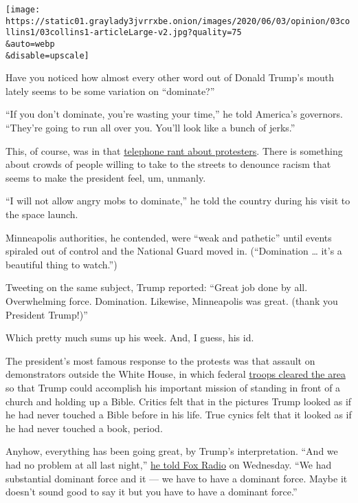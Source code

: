 \texttt{[image: https://static01.graylady3jvrrxbe.onion/images/2020/06/03/opinion/03collins1/03collins1-articleLarge-v2.jpg?quality=75\\\&auto=webp\\\&disable=upscale]}

Have you noticed how almost every other word out of Donald Trump's mouth
lately seems to be some variation on ``dominate?''

``If you don't dominate, you're wasting your time,'' he told America's
governors. ``They're going to run all over you. You'll look like a bunch
of jerks.''

This, of course, was in that
\href{https://www.cnn.com/2020/06/01/politics/wh-governors-call-protests/index.html}{telephone
rant about protesters}. There is something about crowds of people
willing to take to the streets to denounce racism that seems to make the
president feel, um, unmanly.

``I will not allow angry mobs to dominate,'' he told the country during
his visit to the space launch.

Minneapolis authorities, he contended, were ``weak and pathetic'' until
events spiraled out of control and the National Guard moved in.
(``Domination \ldots{} it's a beautiful thing to watch.'')

Tweeting on the same subject, Trump reported: ``Great job done by all.
Overwhelming force. Domination. Likewise, Minneapolis was great. (thank
you President Trump!)''

Which pretty much sums up his week. And, I guess, his id.

The president's most famous response to the protests was that assault on
demonstrators outside the White House, in which federal
\href{https://www.nytimes3xbfgragh.onion/2020/06/01/us/politics/trump-st-johns-church-bible.html}{troops
cleared the area} so that Trump could accomplish his important mission
of standing in front of a church and holding up a Bible. Critics felt
that in the pictures Trump looked as if he had never touched a Bible
before in his life. True cynics felt that it looked as if he had never
touched a book, period.

Anyhow, everything has been going great, by Trump's interpretation.
``And we had no problem at all last night,''
\href{https://radio.foxnews.com/2020/06/03/president-trump-on-the-brian-kilmeade-show/}{he
told Fox Radio} on Wednesday. ``We had substantial dominant force and it
--- we have to have a dominant force. Maybe it doesn't sound good to say
it but you have to have a dominant force.''

